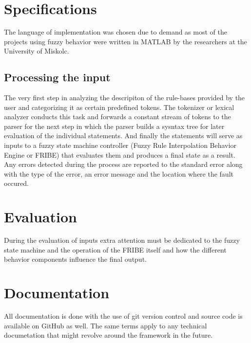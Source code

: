 \documentclass[12pt, titlepage]{article}
\begin{document}
\section{Specifications}
The language of implementation was chosen due to demand as most of the projects using fuzzy behavior were written in MATLAB by the researchers at the University of Miskolc. 

\subsection{Processing the input}
The very first step in analyzing the descripiton of the rule-bases provided by the user and categorizing it as certain predefined tokens. The tokenizer or lexical analyzer conducts this task and forwards a constant stream of tokens to the parser for the next step in which the parser builds a sysntax tree for later evaluation of the individual statements. And finally the statements will serve as inputs to a fuzzy state machine controller (Fuzzy Rule Interpolation Behavior Engine or FRIBE) that evaluates them and produces a final state as a result.
Any errors detected during the process are reported to the standard error along with the type of the error, an error message and the location where the fault occured.


\section{Evaluation}
During the evaluation of inputs extra attention must be  dedicated to the fuzzy state machine and the operation of the FRIBE itself and how the different behavior components influence the final output.

\section{Documentation}
All documentation is done with the use of git version control and source code is available on GitHub as well. The same terms apply to any technical documetation that might revolve around the framework in the future.
\end{document}
